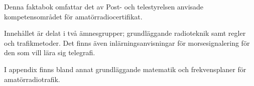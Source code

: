 Denna faktabok omfattar det av Post- och telestyrelsen anvisade
kompetensområdet för amatörradiocertifikat.

Innehållet är delat i två ämnesgrupper; grundläggande radioteknik
samt regler och trafikmetoder.
Det finns även inlärningsanvisningar för morsesignalering för den
som vill lära sig telegrafi.

I appendix finns bland annat grundläggande matematik
och frekvensplaner för amatörradiotrafik.
